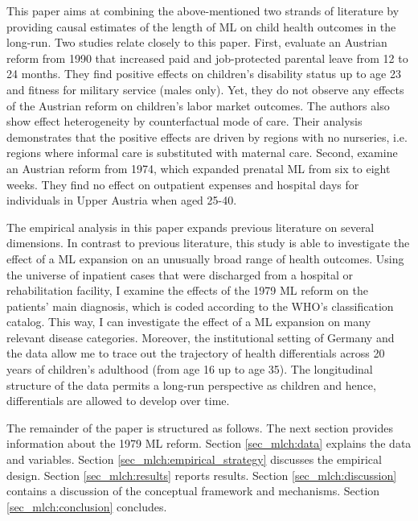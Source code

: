 This paper aims at combining the above-mentioned two strands of literature by providing causal estimates of the length of ML on child health outcomes in the long-run. Two studies relate closely to this paper. First, \cite{danzer2019parental} evaluate an Austrian reform from 1990 that increased paid and job-protected parental leave from 12 to 24 months. They find positive effects on children's disability status up to age 23 and fitness for military service (males only). Yet, they do not observe any effects of the Austrian reform on children's labor market outcomes. The authors also show effect heterogeneity by counterfactual mode of care. Their analysis demonstrates that the positive effects are driven by regions with no nurseries, i.e. regions where informal care is substituted with maternal care. Second, \cite{ahammer2020} examine an Austrian reform from 1974, which expanded prenatal ML from six to eight weeks. They find no effect on outpatient expenses and hospital days for individuals in Upper Austria when aged 25-40.



The empirical analysis in this paper expands previous literature on several dimensions. In contrast to previous literature, this study is able to investigate the effect of a ML expansion on an unusually broad range of health outcomes. Using the universe of inpatient cases that were discharged from a hospital or rehabilitation facility, I examine the effects of the 1979 ML reform on the patients' main diagnosis, which is coded according to the WHO's classification catalog. This way, I can investigate the effect of a ML expansion on many relevant disease categories. Moreover, the institutional setting of Germany and the data allow me to trace out the trajectory of health differentials across 20 years of children's adulthood (from age 16 up to age 35). The longitudinal structure of the data permits a long-run perspective as children and hence, differentials are allowed to develop over time.




The remainder of the paper is structured as follows. The next section provides information about the 1979 ML reform. Section \ref{sec_mlch:data} explains the data and variables. Section \ref{sec_mlch:empirical_strategy} discusses the empirical design. Section \ref{sec_mlch:results} reports results. Section \ref{sec_mlch:discussion} contains a discussion of the conceptual framework and mechanisms. Section \ref{sec_mlch:conclusion} concludes.


